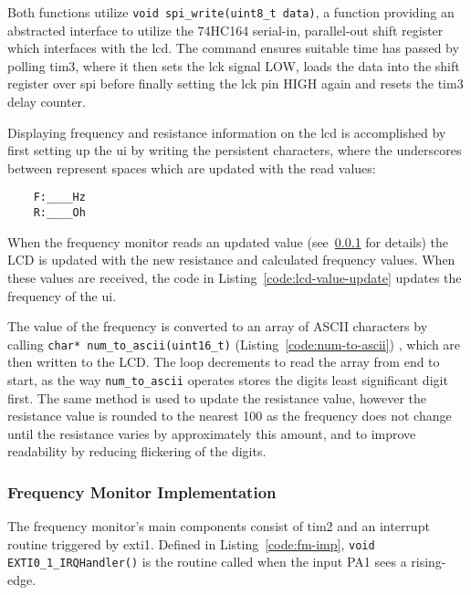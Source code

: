 Both functions utilize \lstinline{void spi_write(uint8_t data)}, a
function providing an abstracted interface to utilize the 74HC164
serial-in, parallel-out shift register which interfaces with the
\gls{lcd}. The command ensures suitable time has passed by polling
\gls{tim3}, where it then sets the \gls{lck} signal LOW, loads the data
into the shift register over \gls{spi} before finally setting the
\gls{lck} pin HIGH again and resets the \gls{tim3} delay counter.

Displaying frequency and resistance information on the \gls{lcd} is
accomplished by first setting up the \gls{ui} by writing the persistent
characters, where the underscores between represent spaces which are
updated with the read values:

\begin{lstlisting}
	F:____Hz
	R:____Oh
\end{lstlisting}

When the frequency monitor reads an updated value (see~\ref{sec:fm-imp}
for details) the LCD is updated with the new resistance and calculated
frequency values. When these values are received, the code in
Listing~\ref{code:lcd-value-update} updates the frequency of the \gls{ui}.


The value of the frequency is converted to an array of ASCII characters
by calling \lstinline{char* num_to_ascii(uint16_t)}
(Listing~\ref{code:num-to-ascii}) , which are then written to the LCD.
The loop decrements to read the array from end to start, as the way
\lstinline{num_to_ascii} operates stores the digits least significant
digit first. The same method is used to update the resistance value,
however the resistance value is rounded to the nearest 100 as the
frequency does not change until the resistance varies by approximately
this amount, and to improve readability by reducing flickering of the
digits.



\subsubsection{Frequency Monitor Implementation} \label{sec:fm-imp}

The frequency monitor's main components consist of \gls{tim2} and an
interrupt routine triggered by \gls{exti1}. Defined in
Listing~\ref{code:fm-imp}, \lstinline{void EXTI0_1_IRQHandler()} is the
routine called when the input PA1 sees a rising-edge.

